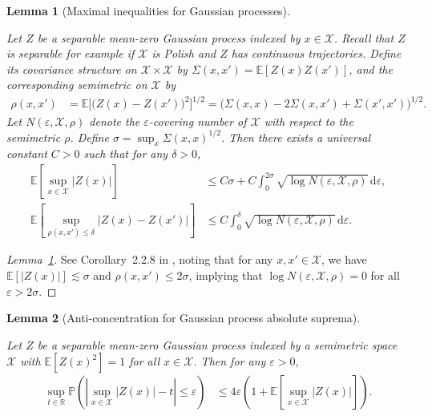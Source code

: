 \documentclass[11pt,lof]{puthesis}
\renewcommand{\P}{\ensuremath{\mathbb{P}}}
\newcommand{\R}{\ensuremath{\mathbb{R}}}
\newcommand{\E}{\ensuremath{\mathbb{E}}}
\newcommand{\cX}{\ensuremath{\mathcal{X}}}
\newcommand{\diff}[1]{\,\mathrm{d}#1}
\theoremstyle{break}
\newtheorem{lemma}{Lemma}[section]
\theoremstyle{proof}
\newtheorem{proof}{Proof}
\begin{document}
\begin{lemma}[Maximal inequalities for Gaussian processes]
\label{lem:kernel_app_gaussian_process_maximal}

Let $Z$ be a separable
mean-zero Gaussian process indexed
by $x \in \cX$.
Recall that $Z$ is separable for example if
$\cX$ is Polish and $Z$ has
continuous trajectories.
Define its covariance structure on $\cX \times \cX$
by $\Sigma(x, x') = \E[Z(x) Z(x')]$,
and the corresponding semimetric on $\cX$ by
%
\begin{align*}
\rho(x,x')
&=
\E\big[\big(Z(x) - Z(x')\big)^2\big]^{1/2}
= \big(\Sigma(x,x)
- 2 \Sigma(x,x')
+ \Sigma(x',x')\big)^{1/2}.
\end{align*}
%
Let $N(\varepsilon, \cX, \rho)$
denote the $\varepsilon$-covering number of $\cX$
with respect to the semimetric $\rho$.
Define $\sigma = \sup_x \Sigma(x,x)^{1/2}$.
Then there exists a universal constant $C > 0$
such that for any $\delta > 0$,
%
\begin{align*}
\E\left[
\sup_{x \in \cX}
|Z(x)|
\right]
&\leq
C \sigma
+ C \int_0^{2\sigma}
\sqrt{\log N(\varepsilon, \cX, \rho)}
\diff{\varepsilon}, \\
\E\left[
\sup_{\rho(x,x') \leq \delta}
|Z(x) - Z(x')|
\right]
&\leq
C \int_0^{\delta}
\sqrt{\log N(\varepsilon, \cX, \rho)}
\diff{\varepsilon}.
\end{align*}

\end{lemma}

\begin{proof}[Lemma~\ref{lem:kernel_app_gaussian_process_maximal}]

See Corollary~2.2.8 in \citet{van1996weak},
noting that for any $x,x' \in \cX$, we have
$\E[|Z(x)|] \lesssim \sigma$ and
$\rho(x,x') \leq 2\sigma$,
implying that
$\log N(\varepsilon, \cX, \rho) = 0$
for all
$\varepsilon > 2 \sigma$.
\end{proof}

\begin{lemma}[Anti-concentration for Gaussian process absolute suprema]
\label{lem:kernel_app_anticoncentration}

Let $Z$ be a separable mean-zero Gaussian process
indexed by a semimetric space $\cX$ with
$\E[Z(x)^2] = 1$
for all $x \in \cX$.
Then for any $\varepsilon > 0$,
%
\begin{align*}
\sup_{t \in \R}
\P\left(
\left|
\sup_{x \in \cX}
\big| Z(x) \big|
- t
\right|
\leq \varepsilon
\right)
&\leq
4 \varepsilon
\left(
1 + \E\left[
\sup_{x \in \cX}
\big| Z(x) \big|
\right]
\right).
\end{align*}

\end{lemma}
\end{document}
